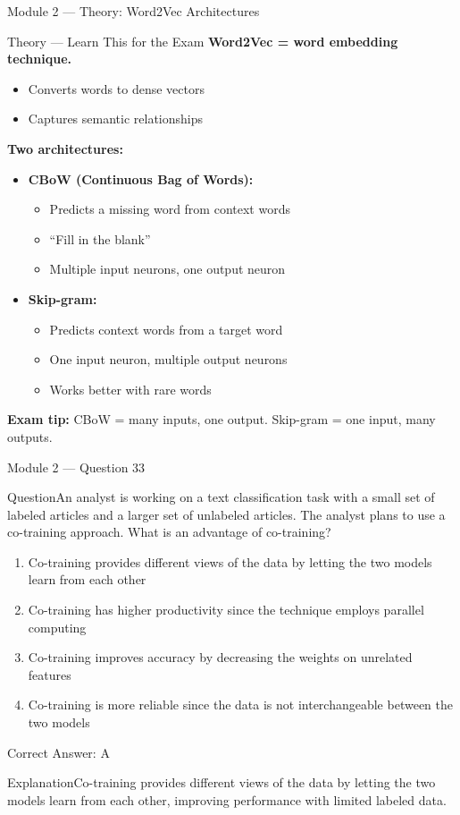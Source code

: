 \documentclass[aspectratio=169,10pt]{beamer}
\newcommand{\question}[1]{\begin{block}{Question}#1\end{block}}
\newcommand{\options}[4]{%
	\begin{enumerate}[label=\Alph*.,leftmargin=*]
		\item #1
		\item #2
		\item #3
		\item #4
	\end{enumerate}
}
\newcommand{\answerbox}[1]{\begin{exampleblock}{Correct Answer: #1}\end{exampleblock}}
\newcommand{\explain}[1]{\begin{block}{Explanation}#1\end{block}}
\newcommand{\theory}[1]{%
	\begin{block}{Theory --- Learn This for the Exam}
		\small #1
	\end{block}
}
\begin{document}
	\begin{frame}{Module 2 --- Theory: Word2Vec Architectures}
		\theory{
			\textbf{Word2Vec = word embedding technique.}
			\begin{itemize}
				\item Converts words to dense vectors
				\item Captures semantic relationships
			\end{itemize}
			\textbf{Two architectures:}
			\begin{itemize}
				\item \textbf{CBoW (Continuous Bag of Words):}
				\begin{itemize}
					\item Predicts a missing word from context words
					\item ``Fill in the blank''
					\item Multiple input neurons, one output neuron
				\end{itemize}
				\item \textbf{Skip-gram:}
				\begin{itemize}
					\item Predicts context words from a target word
					\item One input neuron, multiple output neurons
					\item Works better with rare words
				\end{itemize}
			\end{itemize}
			\textbf{Exam tip:} CBoW = many inputs, one output. Skip-gram = one input, many outputs.
		}
	\end{frame}
	
	\begin{frame}{Module 2 --- Question 33}
		\question{An analyst is working on a text classification task with a small set of labeled articles and a larger set of unlabeled articles. The analyst plans to use a co-training approach. What is an advantage of co-training?}
		\options{Co-training provides different views of the data by letting the two models learn from each other}{Co-training has higher productivity since the technique employs parallel computing}{Co-training improves accuracy by decreasing the weights on unrelated features}{Co-training is more reliable since the data is not interchangeable between the two models}
		\answerbox{A}
		\explain{Co-training provides different views of the data by letting the two models learn from each other, improving performance with limited labeled data.}
	\end{frame}
	
\end{document}
